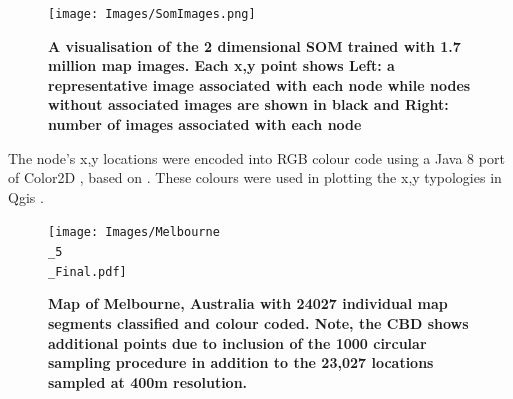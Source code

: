 \documentclass{nature}
\begin{document}
\begin{figure}
\centering    
\texttt{[image: Images/SomImages.png]}  
\caption{\bf  A visualisation of the 2 dimensional SOM trained with 1.7 million map images.  Each x,y point shows Left: a representative image associated with each node while nodes without associated images are shown in black and Right: number of images associated with each node}    
 \label{fig:somresults}  
\end{figure} 



The node's x,y locations were encoded into RGB colour code using a Java 8 port of Color2D  \cite{Jackle2017}, based on \cite{Steiger2015}. These colours were used in plotting the x,y typologies in Qgis \cite{QGIS2009}.


\begin{figure}
\centering    
\texttt{[image: Images/Melbourne\\\_5\\\_Final.pdf]}  
\caption{\bf  Map of Melbourne, Australia with 24027 individual map segments classified and colour coded. Note, the CBD shows additional points due to inclusion of the 1000 circular sampling procedure in addition to the 23,027 locations sampled at 400m resolution. }    
 \label{fig:mel23000}  
\end{figure} 









 





\end{document}
